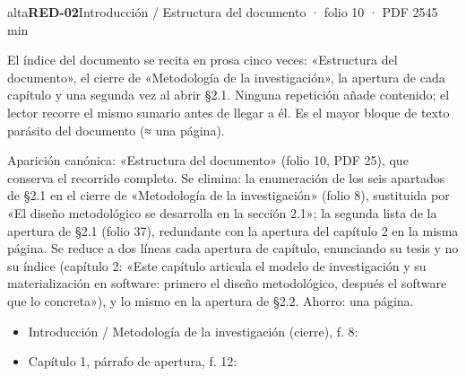 \begin{ficha}{alta}{\casilla\textbf{RED-02}\quad{}\quad Introducción /\allowbreak{} Estructura del documento · folio 10 · PDF 25\hfill 45 min}
\par
{}El índice del documento se recita en prosa cinco veces: «Estructura del documento», el cierre de «Metodología de la investigación», la apertura de cada capítulo y una segunda vez al abrir §2.1. Ninguna repetición añade contenido; el lector recorre el mismo sumario antes de llegar a él. Es el mayor bloque de texto parásito del documento ({\mates ≈} una página).\par
{}Aparición canónica: «Estructura del documento» (folio 10, PDF 25), que conserva el recorrido completo. Se elimina: la enumeración de los seis apartados de §2.1 en el cierre de «Metodología de la investigación» (folio 8), sustituida por «El diseño metodológico se desarrolla en la sección 2.1»; la segunda lista de la apertura de §2.1 (folio 37), redundante con la apertura del capítulo 2 en la misma página. Se reduce a dos líneas cada apertura de capítulo, enunciando su tesis y no su índice (capítulo 2: «Este capítulo articula el modelo de investigación y su materialización en software: primero el diseño metodológico, después el software que lo concreta»), y lo mismo en la apertura de §2.2. Ahorro: una página.\par
{}\begin{itemize}[leftmargin=1.2em,itemsep=1pt,topsep=1pt]
\item {\small Introducción /\allowbreak{} Metodología de la investigación (cierre), f. 8: }
\item {\small Capítulo 1, párrafo de apertura, f. 12: }

\end{itemize}
\end{ficha}
